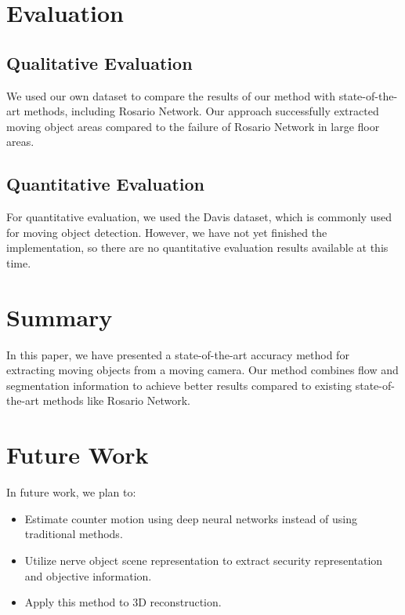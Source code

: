 \documentclass[10pt, twocolumn]{article}
\begin{document}
\section{Evaluation}

\subsection{Qualitative Evaluation}
We used our own dataset to compare the results of our method with state-of-the-art methods, including Rosario Network. Our approach successfully extracted moving object areas compared to the failure of Rosario Network in large floor areas.

\subsection{Quantitative Evaluation}
For quantitative evaluation, we used the Davis dataset, which is commonly used for moving object detection. However, we have not yet finished the implementation, so there are no quantitative evaluation results available at this time.

\section{Summary}
In this paper, we have presented a state-of-the-art accuracy method for extracting moving objects from a moving camera. Our method combines flow and segmentation information to achieve better results compared to existing state-of-the-art methods like Rosario Network.

\section{Future Work}
In future work, we plan to:

\begin{itemize}
  \item Estimate counter motion using deep neural networks instead of using traditional methods.
  \item Utilize nerve object scene representation to extract security representation and objective information.
  \item Apply this method to 3D reconstruction.
\end{itemize}



\end{document}
